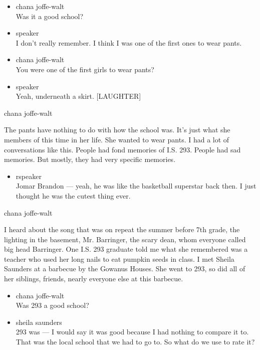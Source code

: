 \begin{itemize}
\item
  chana joffe-walt\\
  Was it a good school?
\item
  speaker\\
  I don't really remember. I think I was one of the first ones to wear
  pants.
\item
  chana joffe-walt\\
  You were one of the first girls to wear pants?
\item
  speaker\\
  Yeah, underneath a skirt. {[}LAUGHTER{]}
\end{itemize}

chana joffe-walt

The pants have nothing to do with how the school was. It's just what she
members of this time in her life. She wanted to wear pants. I had a lot
of conversations like this. People had fond memories of I.S. 293. People
had sad memories. But mostly, they had very specific memories.

\begin{itemize}
\tightlist
\item
  rspeaker\\
  Jomar Brandon --- yeah, he was like the basketball superstar back
  then. I just thought he was the cutest thing ever.
\end{itemize}

chana joffe-walt

I heard about the song that was on repeat the summer before 7th grade,
the lighting in the basement, Mr. Barringer, the scary dean, whom
everyone called big head Barringer. One I.S. 293 graduate told me what
she remembered was a teacher who used her long nails to eat pumpkin
seeds in class. I met Sheila Saunders at a barbecue by the Gowanus
Houses. She went to 293, so did all of her siblings, friends, nearly
everyone else at this barbecue.

\begin{itemize}
\item
  chana joffe-walt\\
  Was 293 a good school?
\item
  sheila saunders\\
  293 was --- I would say it was good because I had nothing to compare
  it to. That was the local school that we had to go to. So what do we
  use to rate it?
\end{itemize}

